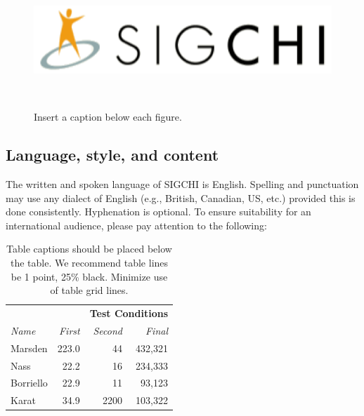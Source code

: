 \documentclass{sigchi-ext}
\begin{document}
\begin{figure}
  \includegraphics[width=0.9\columnwidth]{figures/sigchi-logo}
  \caption{Insert a caption below each figure.}~\label{fig:sample}
\end{figure}

\subsection{Language, style, and content}
The written and spoken language of SIGCHI is English. Spelling and
punctuation may use any dialect of English (e.g., British, Canadian,
US, etc.) provided this is done consistently. Hyphenation is
optional. To ensure suitability for an international audience, please
pay attention to the following:

\begin{table}
  \centering
  \begin{tabular}{l r r r}
    & & \multicolumn{2}{c}{\small{\textbf{Test Conditions}}} \\
    \cmidrule(r){3-4}
    {\small\textit{Name}}
    & {\small \textit{First}}
      & {\small \textit{Second}}
    & {\small \textit{Final}} \\
    \midrule
    Marsden & 223.0 & 44 & 432,321 \\
    Nass & 22.2 & 16 & 234,333 \\
    Borriello & 22.9 & 11 & 93,123 \\
    Karat & 34.9 & 2200 & 103,322 \\
  \end{tabular}
  \caption{Table captions should be placed below the table. We
    recommend table lines be 1 point, 25\% black. Minimize use of
    table grid lines.}~\label{tab:table1}
\end{table}
\end{document}
